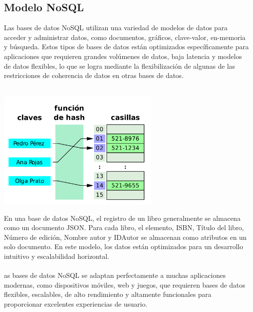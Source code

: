 \documentclass[%
 reprint,
 amsmath,amssymb,
 aps,
]{revtex4-1}
\begin{document}
\subsection{Modelo NoSQL}
Las bases de datos NoSQL utilizan una variedad de modelos de datos para acceder y administrar datos, como documentos, gráficos, clave-valor, en-memoria y búsqueda. Estos tipos de bases de datos están optimizados específicamente para aplicaciones que requieren grandes volúmenes de datos, baja latencia y modelos de datos flexibles, lo que se logra mediante la flexibilización de algunas de las restricciones de coherencia de datos en otras bases de datos.\\\\
                     \begin{center}
		\includegraphics[width=8cm]{./Imagenes/2}
		\end{center}	
En una base de datos NoSQL, el registro de un libro generalmente se almacena como un documento JSON. Para cada libro, el elemento, ISBN, Título del libro, Número de edición, Nombre autor y IDAutor se almacenan como atributos en un solo documento. En este modelo, los datos están optimizados para un desarrollo intuitivo y escalabilidad horizontal.\\\\
as bases de datos NoSQL se adaptan perfectamente a muchas aplicaciones modernas, como dispositivos móviles, web y juegos, que requieren bases de datos flexibles, escalables, de alto rendimiento y altamente funcionales para proporcionar excelentes experiencias de usuario.\\\\
\end{document}
